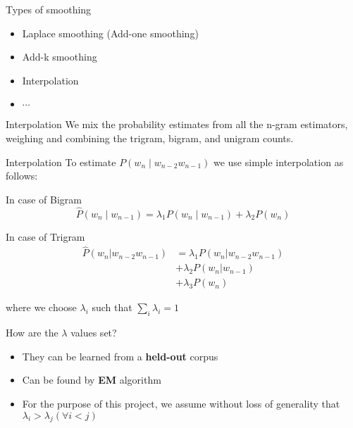 \documentclass{beamer}
\begin{document}
\begin{frame}{Types of smoothing}
    \begin{itemize}
        \item Laplace smoothing (Add-one smoothing)
        \item Add-k smoothing
        \item Interpolation
        \item $\cdots$
    \end{itemize}
    \begin{block}{Interpolation}
        We mix the probability estimates from all the n-gram estimators, weighing and combining the trigram, bigram, and unigram counts.
    \end{block}
\end{frame}

\begin{frame}{Interpolation}
    To estimate $P(w_n\mid w_{n-2}w_{n-1})$ we use simple interpolation as follows:
    \begin{block}{In case of Bigram}
        $$\hat{P}(w_n\mid w_{n-1}) = \lambda_1P(w_n\mid w_{n-1}) + \lambda_2P(w_n)$$
    \end{block}

    \begin{block}{In case of Trigram}
        \begin{align*}
            \hat{P} (w_n|w_{n-2}w_{n-1}) &= \lambda_1P(w_n|w_{n-2}w_{n-1})\\
                                         &+ \lambda_2P(w_n|w_{n-1})\\
                                         &+ \lambda_3P(w_n)
        \end{align*}
    \end{block}
    where we choose $\lambda_i$ such that $\sum_i\lambda_i = 1$
\end{frame}

\begin{frame}{How are the $\lambda$ values set?}
    \begin{itemize}
        \item They can be learned from a \textbf{held-out} corpus
        \item Can be found by \textbf{EM} algorithm
        \item For the purpose of this project, we assume without loss of generality that $\lambda_i > \lambda_j (\forall i < j)$
    \end{itemize}
\end{frame}
\end{document}

